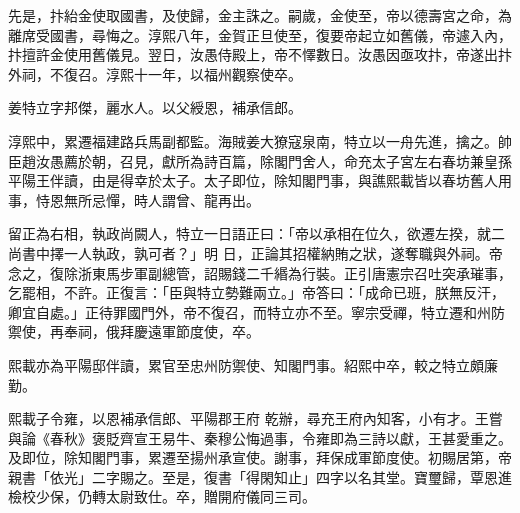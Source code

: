 \begin{pinyinscope}
 先是，抃紿金使取國書，及使歸，金主誅之。嗣歲，金使至，帝以德壽宮之命，為離席受國書，尋悔之。淳熙八年，金賀正旦使至，復要帝起立如舊儀，帝遽入內，抃擅許金使用舊儀見。翌日，汝愚侍殿上，帝不懌數日。汝愚因亟攻抃，帝遂出抃外祠，不復召。淳熙十一年，以福州觀察使卒。



 姜特立字邦傑，麗水人。以父綬恩，補承信郎。



 淳熙中，累遷福建路兵馬副都監。海賊姜大獠寇泉南，特立以一舟先進，擒之。帥臣趙汝愚薦於朝，召見，獻所為詩百篇，除閣門舍人，命充太子宮左右春坊兼皇孫平陽王伴讀，由是得幸於太子。太子即位，除知閣門事，與譙熙載皆以春坊舊人用事，恃恩無所忌憚，時人謂曾、龍再出。



 留正為右相，執政尚闕人，特立一日語正曰：「帝以承相在位久，欲遷左揆，就二尚書中擇一人執政，孰可者？」明
 日，正論其招權納賄之狀，遂奪職與外祠。帝念之，復除浙東馬步軍副總管，詔賜錢二千緡為行裝。正引唐憲宗召吐突承璀事，乞罷相，不許。正復言：「臣與特立勢難兩立。」帝答曰：「成命已班，朕無反汗，卿宜自處。」正待罪國門外，帝不復召，而特立亦不至。寧宗受禪，特立遷和州防禦使，再奉祠，俄拜慶遠軍節度使，卒。



 熙載亦為平陽邸伴讀，累官至忠州防禦使、知閣門事。紹熙中卒，較之特立頗廉勤。



 熙載子令雍，以恩補承信郎、平陽郡王府
 乾辦，尋充王府內知客，小有才。王嘗與論《春秋》褒貶齊宣王易牛、秦穆公悔過事，令雍即為三詩以獻，王甚愛重之。及即位，除知閣門事，累遷至揚州承宣使。謝事，拜保成軍節度使。初賜居第，帝親書「依光」二字賜之。至是，復書「得閑知止」四字以名其堂。寶璽歸，覃恩進檢校少保，仍轉太尉致仕。卒，贈開府儀同三司。



\end{pinyinscope}